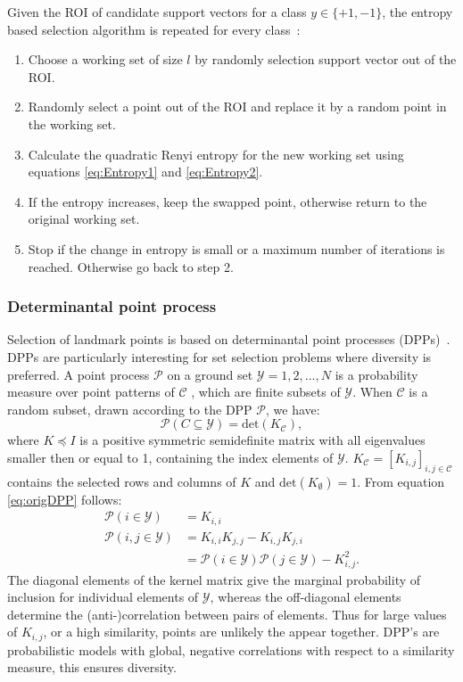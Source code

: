 \documentclass[preprint,12pt]{elsarticle}
\begin{document}
	Given the ROI of candidate support vectors for a class $y \in \{+1,-1\}$, the entropy based selection algorithm is repeated for every class~\cite{suykens2002least}:
	\begin{enumerate}
		\item Choose a working set of size $l$ by randomly selection support vector out of the ROI.
		\item Randomly select a point out of the ROI and replace it by a random point in the working set.
		\item Calculate the quadratic Renyi entropy for the new working set using equations \eqref{eq:Entropy1} and \eqref{eq:Entropy2}.
		\item If the entropy increases, keep the swapped point, otherwise return to the original working set.
		\item Stop if the change in entropy is small or a maximum number of iterations is reached. Otherwise go back to step 2.
	\end{enumerate}
		

	\subsubsection{Determinantal point process}
	Selection of landmark points is based on determinantal point processes (DPPs)~\cite{kulesza2012determinantal}. DPPs are particularly interesting for set selection problems where diversity is preferred. A point process $\mathcal{P}$ on a ground set $\mathcal{Y} = {1,2,...,N}$ is a probability measure over point patterns of $\mathcal{C}$ , which are finite subsets of $\mathcal{Y}$. When $\mathcal{C}$ is a random subset, drawn according to the DPP $\mathcal{P}$, we have:
	\begin{equation}
	\label{eq:origDPP}
	\mathcal{P}(C \subseteq \mathcal{Y}) = \mathrm{det}(K_{\mathcal{C}}),
	\end{equation}
	where $K \preceq I$ is a positive symmetric semidefinite matrix with all eigenvalues smaller then or equal to 1, containing the index elements of $\mathcal{Y}$. $K_{\mathcal{C}} = [K_{i,j}]_{i,j \in \mathcal{C}}$ contains the selected rows and columns of $K$ and $\mathrm{det}(K_{\emptyset}) = 1$. From equation \eqref{eq:origDPP} follows:
	\begin{align}
	\mathcal{P}(i \in \mathcal{Y}) &= K_{i,i} \\
	\mathcal{P}(i,j \in \mathcal{Y}) &= K_{i,i}K_{j,j} - K_{i,j}K_{j,i}\\
	\label{eq:KDPP}
	&= \mathcal{P}(i \in \mathcal{Y})\mathcal{P}(j \in \mathcal{Y}) - K_{i,j}^2.
	\end{align}
	The diagonal elements of the kernel matrix give the marginal probability of inclusion for individual elements of $\mathcal{Y}$, whereas the off-diagonal elements determine the (anti-)correlation between pairs of elements. Thus for large values of $K_{i,j}$, or a high similarity, points are unlikely the appear together. DPP's are probabilistic models with global, negative correlations with respect to a similarity measure, this ensures diversity.
	
\end{document}
